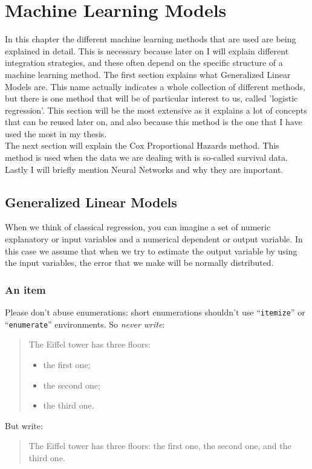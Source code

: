 \chapter{Machine Learning Models}
\label{cha:1}
In this chapter the different machine learning methods that are used are being explained in detail. This is necessary because later on I will explain different integration strategies, and these often depend on the specific structure of a machine learning method. The first section explains what Generalized Linear Models are. This name actually indicates a whole collection of different methods, but there is one method that will be of particular interest to us, called 'logistic regression'. This section will be the most extensive as it explains a lot of concepts that can be reused later on, and also because this method is the one that I have used the most in my thesis. \\
The next section will explain the Cox Proportional Hazards method. This method is used when the data we are dealing with is so-called survival data. \\
Lastly I will briefly mention Neural Networks and why they are important.

\section{Generalized Linear Models}
When we think of classical regression, you can imagine a set of numeric explanatory or input variables and a numerical dependent or output variable. In this case we assume that when we try to estimate the output variable by using the input variables, the error that we make will be normally distributed.

\lipsum[55]

\subsection{An item}
Please don't abuse enumerations: short enumerations shouldn't use
``\verb|itemize|'' or ``\texttt{enumerate}'' environments.
So \emph{never write}: 
\begin{quote}
  The Eiffel tower has three floors:
  \begin{itemize}
  \item the first one;
  \item the second one;
  \item the third one.
  \end{itemize}
\end{quote}
But write:
\begin{quote}
  The Eiffel tower has three floors: the first one, the second one, and the
  third one.
\end{quote}

